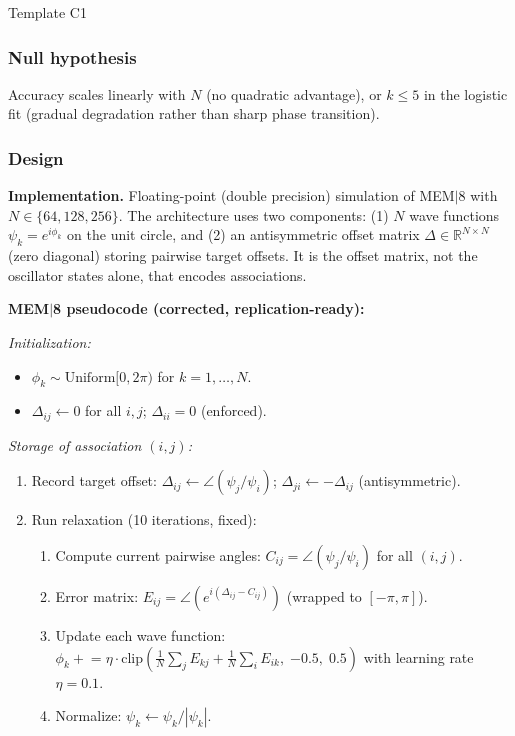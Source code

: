 \documentclass[11pt, a4paper]{article}
\newcommand{\mem}{MEM$|$8}
\begin{document}
\begin{predbox}{Template C1}
\subsubsection{Null hypothesis}

Accuracy scales linearly with $N$ (no quadratic advantage), or $k \leq 5$ in the
logistic fit (gradual degradation rather than sharp phase transition).

\subsubsection{Design}

\textbf{Implementation.}
Floating-point (double precision) simulation of \mem{} with
$N \in \{64, 128, 256\}$.  The architecture uses two components:
(1) $N$ wave functions $\psi_k = e^{i\phi_k}$ on the unit circle, and
(2) an antisymmetric offset matrix $\Delta \in \mathbb{R}^{N \times N}$
(zero diagonal) storing pairwise target offsets.  It is the offset matrix,
not the oscillator states alone, that encodes associations.

\medskip
\noindent\textbf{\mem{} pseudocode (corrected, replication-ready):}

\smallskip
\noindent\textit{Initialization:}
\begin{itemize}[topsep=1pt, itemsep=0pt]
  \item $\phi_k \sim \mathrm{Uniform}[0, 2\pi)$ for $k = 1, \ldots, N$.
  \item $\Delta_{ij} \leftarrow 0$ for all $i, j$; $\Delta_{ii} = 0$ (enforced).
\end{itemize}

\noindent\textit{Storage of association $(i, j)$:}
\begin{enumerate}[topsep=2pt, itemsep=1pt]
  \item Record target offset: $\Delta_{ij} \leftarrow \angle(\psi_j / \psi_i)$;
    $\Delta_{ji} \leftarrow -\Delta_{ij}$ (antisymmetric).
  \item Run relaxation (10 iterations, fixed):
    \begin{enumerate}[label=\alph*., topsep=1pt, itemsep=0pt]
      \item Compute current pairwise angles:
        $C_{ij} = \angle(\psi_j / \psi_i)$ for all $(i,j)$.
      \item Error matrix: $E_{ij} = \angle(e^{i(\Delta_{ij} - C_{ij})})$
        (wrapped to $[-\pi, \pi]$).
      \item Update each wave function:
        $\phi_k \mathrel{+}= \eta \cdot \mathrm{clip}
          \!\left(\tfrac{1}{N}\sum_{j}E_{kj} + \tfrac{1}{N}\sum_{i}E_{ik},\;
          {-0.5},\; {0.5}\right)$
        with learning rate $\eta = 0.1$.
      \item Normalize: $\psi_k \leftarrow \psi_k / |\psi_k|$.
    \end{enumerate}
\end{enumerate}


\end{predbox}
\end{document}
